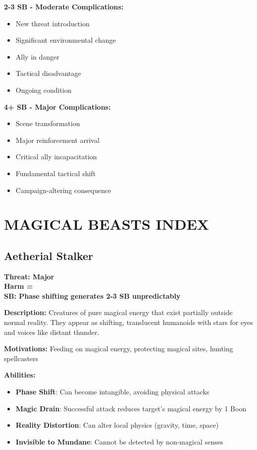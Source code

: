 \documentclass[12pt]{article}
\newcommand{\cp}[1]{\textbf{SB: #1}}
\newcommand{\harm}[1]{\textbf{Harm #1}}
\newcommand{\threat}[1]{\textbf{Threat: #1}}
\begin{document}
\begin{itemize}
\textbf{2-3 SB - Moderate Complications:}
\begin{itemize}
\item New threat introduction
\item Significant environmental change
\item Ally in danger
\item Tactical disadvantage
\item Ongoing condition
\end{itemize}

\textbf{4+ SB - Major Complications:}
\begin{itemize}
\item Scene transformation
\item Major reinforcement arrival
\item Critical ally incapacitation
\item Fundamental tactical shift
\item Campaign-altering consequence
\end{itemize}

\section{MAGICAL BEASTS INDEX}

\subsection*{Aetherial Stalker}

\threat{Major} \\
\harm{=} \\
\cp{Phase shifting generates 2-3 SB unpredictably}

\vspace{0.5em}
\textbf{Description:} Creatures of pure magical energy that exist partially outside normal reality. They appear as shifting, translucent humanoids with stars for eyes and voices like distant thunder.

\textbf{Motivations:} Feeding on magical energy, protecting magical sites, hunting spellcasters

\textbf{Abilities:}
\begin{itemize}
\item \textbf{Phase Shift}: Can become intangible, avoiding physical attacks
\item \textbf{Magic Drain}: Successful attack reduces target's magical energy by 1 Boon
\item \textbf{Reality Distortion}: Can alter local physics (gravity, time, space)
\item \textbf{Invisible to Mundane}: Cannot be detected by non-magical senses
\end{itemize}


\end{itemize}
\end{document}
